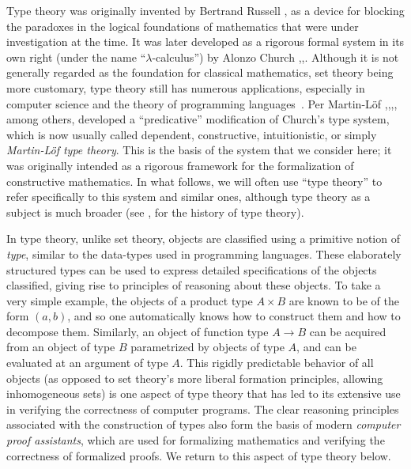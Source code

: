 \documentclass[12pt]{article}
\newcommand{\indexsee}[2]{\index{#1|see{#2}}}
\newcommand{\pairr}[1]{{\mathopen{}(#1)\mathclose{}}}
\begin{document}
Type theory was originally invented by Bertrand Russell \cite{Russell:1908}, as a device for blocking the paradoxes in the logical foundations of mathematics  that were under investigation at the time. It was later developed as a rigorous formal system in its own right (under the name ``$\lambda$-calculus'') by Alonzo Church \cite{Church:1933cl},\cite{Church:1940tu},\cite{Church:1941tc}.  Although it is not generally regarded as the foundation for classical mathematics, set theory being more customary, type theory still has numerous applications, especially in computer science and the theory of programming languages~\cite{Pierce-TAPL}.
%
%
%
Per Martin-L\"{o}f \cite{Martin-Lof-1972},\cite{Martin-Lof-1973},\cite{Martin-Lof-1979},\cite{martin-lof:bibliopolis}, among others,
developed a ``predicative'' modification of Church's type system, which is now usually called dependent, constructive, intuitionistic, or simply \emph{Martin\--L\"of type theory}. This is the basis of the system that we consider here; it was originally intended as a rigorous framework for the formalization of constructive mathematics.  In what follows, we will often use ``type theory'' to refer specifically to this system and similar ones, although type theory as a subject is much broader (see \cite{somma},\cite{kamar} for the history of type theory).

In type theory, unlike set theory, objects are classified using a primitive notion of \emph{type}, similar to the data-types used in programming languages.  These elaborately structured types can be used to express detailed specifications of the objects classified, giving rise to principles of reasoning about these objects.  To take a very simple example, the objects of a product type $A\times B$ are known to be of the form $\pairr{a,b}$, and so one automatically knows how to construct them and how to decompose them. Similarly, an object of function type $A\to B$ can be acquired from an object of type $B$ parametrized by objects of type $A$, and can be evaluated at an argument of type $A$.  This rigidly predictable behavior of all objects (as opposed to set theory's more liberal formation principles, allowing inhomogeneous sets) is one aspect of type theory that has led to its extensive use in verifying the correctness of computer programs.  The clear reasoning principles associated with the construction of types also form the basis of modern \emph{computer proof assistants},%
%
\indexsee{computer proof assistant}{proof assistant}
%
which are used for formalizing mathematics and verifying the correctness of formalized proofs.  We return to this aspect of type theory below.  
\end{document}
